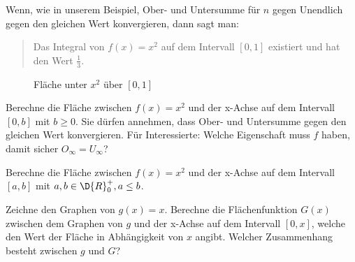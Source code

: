 \documentclass[%
11pt,%
twoside,%
titlepage,%
german,%
headsepline%
]{scrartcl}
\begin{document}
Wenn, wie in unserem Beispiel, Ober- und Untersumme für $n$ gegen Unendlich gegen den gleichen Wert konvergieren, dann sagt man:
\begin{quote}
\glqq Das Integral von $f(x)=x^2$ auf dem Intervall $[0,1]$ existiert und hat den Wert $\frac{1}{3}$\grqq.
\end{quote}

\begin{figure}
\begin{center}
\caption{Fläche unter $x^2$ über $[0,1]$}
\end{center}
\end{figure}

\begin{ueb}[Zwischensummen]
Berechne die Fläche zwischen $f(x)=x^2$ und der x-Achse auf dem Intervall $[0,b]$ mit $b\geq0$. Sie dürfen annehmen, dass Ober- und Untersumme gegen den gleichen Wert konvergieren. Für Interessierte: Welche Eigenschaft muss $f$ haben, damit sicher $O_\infty=U_\infty$?
\end{ueb}

\begin{ueb}[Zwischensummen 2]
Berechne die Fläche zwischen $f(x)=x^2$ und der x-Achse auf dem Intervall $[a,b]$ mit $a,b\in\D{R}^+_0, a\leq b$.
\end{ueb}

\begin{ueb}[Stammfunktion]
Zeichne den Graphen von $g(x)=x$. Berechne die Flächenfunktion $G(x)$ zwischen dem Graphen von $g$ und der x-Achse auf dem Intervall $[0,x]$, welche den Wert der Fläche in Abhängigkeit von $x$ angibt. Welcher Zusammenhang besteht zwischen $g$ und $G$?
\end{ueb}
\end{document}
